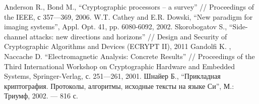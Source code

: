 \begin{thebibliography}{1}

 Anderson R., Bond M., ``Cryptographic processors – a survey'' // Proceedings of the IEEE, с 357—369, 2006.
 W.T. Cathey and E.R. Dowski, ``New paradigm for imaging systems'', Appl. Opt. 41, pp. 6080-6092, 2002.
 Skorobogatov S., ``Side-channel attacks: new directions and horizons'' // Design and Security of Cryptographic Algorithms and Devices (ECRYPT II), 2011
 Gandolfi K. , Naccache D. ``Electromagnetic Analysis: Concrete Results'' // Proceedings of the Third International Workshop on Cryptographic Hardware and Embedded Systems, Springer-Verlag, с. 251—261, 2001.
 Шнайер Б., ``Прикладная криптография. Протоколы, алгоритмы, исходные тексты на языке Си'', М.: Триумф, 2002. — 816 с.
\end{thebibliography}
